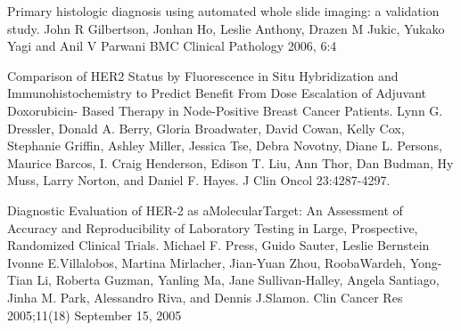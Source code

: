 \documentclass[10pt]{amsart}
\theoremstyle{definition}
\theoremstyle{remark}
\numberwithin{equation}{section}
\begin{document}
\begin{thebibliography}{12}


 Primary histologic diagnosis using automated whole slide
imaging: a validation study. John R Gilbertson, Jonhan Ho, Leslie
Anthony, Drazen M Jukic, Yukako Yagi and Anil V Parwani
 BMC Clinical Pathology 2006, 6:4

 Comparison of HER2 Status by Fluorescence in Situ
Hybridization and Immunohistochemistry to Predict Benefit From
Dose Escalation of Adjuvant Doxorubicin- Based Therapy in
Node-Positive Breast Cancer Patients.  Lynn G. Dressler, Donald A.
Berry, Gloria Broadwater, David Cowan, Kelly Cox, Stephanie
Griffin, Ashley Miller, Jessica Tse, Debra Novotny, Diane L.
Persons, Maurice Barcos, I. Craig Henderson, Edison T. Liu, Ann
Thor, Dan Budman, Hy Muss, Larry Norton, and Daniel F. Hayes. J
Clin Oncol 23:4287-4297.

 Diagnostic Evaluation of HER-2 as aMolecularTarget: An
Assessment of Accuracy and Reproducibility of Laboratory Testing
in Large, Prospective, Randomized Clinical Trials. Michael F.
Press, Guido Sauter, Leslie Bernstein Ivonne E.Villalobos, Martina
Mirlacher, Jian-Yuan Zhou, RoobaWardeh, Yong-Tian Li, Roberta
Guzman, Yanling Ma, Jane Sullivan-Halley, Angela Santiago, Jinha
M. Park, Alessandro Riva, and Dennis J.Slamon.  Clin Cancer Res
2005;11(18) September 15, 2005

\end{thebibliography}




\end{document}

